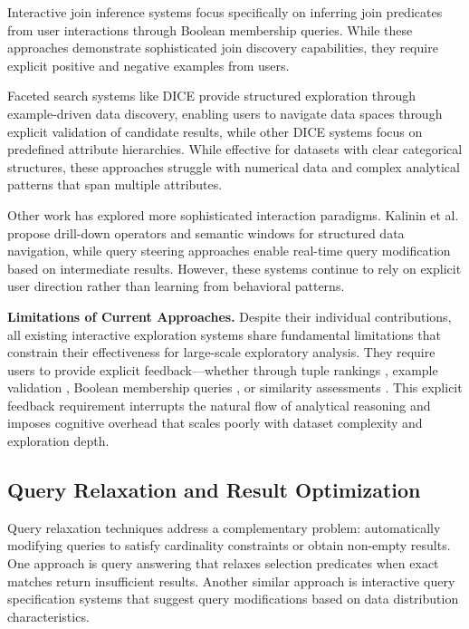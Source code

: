 \documentclass[sigconf, nonacm]{acmart}
\begin{document}
Interactive join inference systems \cite{bonifati2014interactive} focus specifically on inferring join predicates from user interactions through Boolean membership queries. While these approaches demonstrate sophisticated join discovery capabilities, they require explicit positive and negative examples from users.

Faceted search systems like DICE \cite{rezig2021dice} provide structured exploration through example-driven data discovery, enabling users to navigate data spaces through explicit validation of candidate results, while other DICE systems \cite{el2016dice} focus on predefined attribute hierarchies. While effective for datasets with clear categorical structures, these approaches struggle with numerical data and complex analytical patterns that span multiple attributes.

Other work has explored more sophisticated interaction paradigms. Kalinin et al. \cite{kalininInteractiveDataExploration2014} propose drill-down operators and semantic windows for structured data navigation, while query steering approaches \cite{ugurcetintemelQuerySteeringInteractive2013} enable real-time query modification based on intermediate results. However, these systems continue to rely on explicit user direction rather than learning from behavioral patterns.

\textbf{Limitations of Current Approaches.} Despite their individual contributions, all existing interactive exploration systems share fundamental limitations that constrain their effectiveness for large-scale exploratory analysis. They require users to provide explicit feedback—whether through tuple rankings \cite{dimitriadouAIDEActiveLearningBased2016}, example validation \cite{rezig2021dice}, Boolean membership queries \cite{bonifati2014interactive}, or similarity assessments \cite{mottin2014exemplar}. This explicit feedback requirement interrupts the natural flow of analytical reasoning and imposes cognitive overhead that scales poorly with dataset complexity and exploration depth.

\subsection{Query Relaxation and Result Optimization}

Query relaxation techniques address a complementary problem: automatically modifying queries to satisfy cardinality constraints or obtain non-empty results. One approach is query answering \cite{lim2013flexible} that relaxes selection predicates when exact matches return insufficient results. Another similar approach is interactive query specification systems \cite{mishra2009interactive} that suggest query modifications based on data distribution characteristics.
\end{document}
